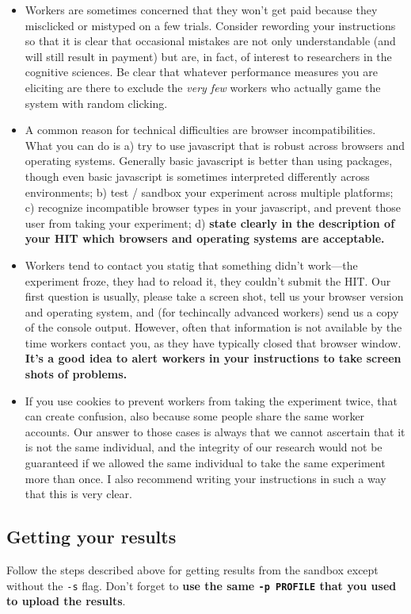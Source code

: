 \documentclass{article}
\begin{document}
\begin{itemize}
	\item Workers are sometimes concerned that they won't get paid because they misclicked or mistyped on a few trials. Consider rewording your instructions so that it is clear that occasional mistakes are not only understandable (and will still result in payment) but are, in fact, of interest to researchers in the cognitive sciences. Be clear that whatever performance measures you are eliciting are there to exclude the {\em very few} workers who actually game the system with random clicking.
	\item A common reason for technical difficulties are browser incompatibilities. What you can do is a) try to use javascript that is robust across browsers and operating systems. Generally basic javascript is better than using packages, though even basic javascript is sometimes interpreted differently across environments; b) test / sandbox your experiment across multiple platforms; c) recognize incompatible browser types in your javascript, and prevent those user from taking your experiment; d) {\bf state clearly in the description of your HIT which browsers and operating systems are acceptable.}
	\item Workers tend to contact you statig that something didn't work---the experiment froze, they had to reload it, they couldn't submit the HIT. Our first question is usually, please take a screen shot, tell us your browser version and operating system, and (for techincally advanced workers) send us a copy of the console output. However, often that information is not available by the time workers contact you, as they have typically closed that browser window. {\bf It's a good idea to alert workers in your instructions to take screen shots of problems.}
	\item If you use cookies to prevent workers from taking the experiment twice, that can create confusion, also because some people share the same worker accounts. Our answer to those cases is always that we cannot ascertain that it is not the same individual, and the integrity of our research would not be guaranteed if we allowed the same individual to take the same experiment more than once. I also recommend writing your instructions in such a way that this is very clear.
	
\end{itemize}
   

\subsection{Getting your results}
Follow the steps described above for getting results from the sandbox except without the \texttt{-s} flag. Don't forget to {\bf use the same \texttt{-p PROFILE} that you used to upload the results}.
\end{document}
